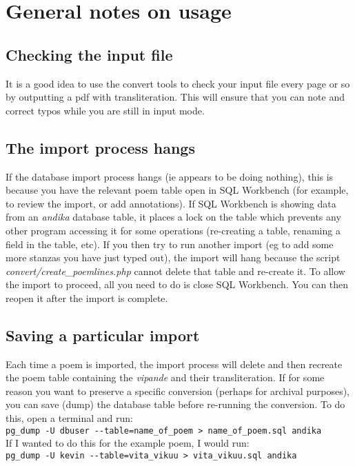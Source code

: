\section{General notes on usage}

\subsection{Checking the input file}

It is a good idea to use the convert tools to check your input file every page or so by outputting a pdf with transliteration.  This will ensure that you can note and correct typos while you are still in input mode.

\subsection{The import process hangs}

If the database import process hangs (ie appears to be doing nothing), this is because you have the relevant poem table open in SQL Workbench (for example, to review the import, or add annotations).  If SQL Workbench is showing data from an \textit{andika} database table, it places a lock on the table which prevents any other program accessing it for some operations (re-creating a table, renaming a field in the table, etc).  If you then try to run another import (eg to add some more stanzas you have just typed out), the import will hang because the script \textit{convert/create_poemlines.php} cannot delete that table and re-create it.  To allow the import to proceed, all you need to do is close SQL Workbench.  You can then reopen it after the import is complete.

\subsection{Saving a particular import}

Each time a poem is imported, the import process will delete and then recreate the poem table containing the \textit{vipande} and their transliteration.  If for some reason you want to preserve a specific conversion (perhaps for archival purposes), you can save (dump) the database table before re-running the conversion.  To do this, open a terminal and run:\\
\verb|pg_dump -U dbuser --table=name_of_poem > name_of_poem.sql andika|\\
If I wanted to do this for the example poem, I would run:\\
\verb|pg_dump -U kevin --table=vita_vikuu > vita_vikuu.sql andika|\\

